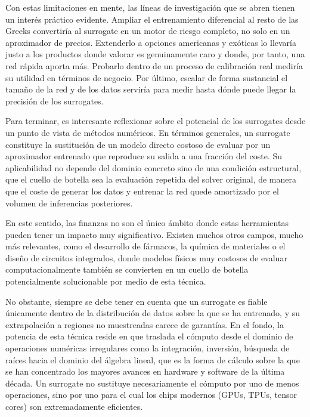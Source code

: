 \documentclass[11pt,a4paper]{article}
\begin{document}
Con estas limitaciones en mente, las líneas de investigación que se abren tienen un interés práctico evidente. Ampliar el entrenamiento diferencial al resto de las Greeks convertiría al surrogate en un motor de riesgo completo, no solo en un aproximador de precios. Extenderlo a opciones americanas y exóticas lo llevaría justo a los productos donde valorar es genuinamente caro y donde, por tanto, una red rápida aporta más. Probarlo dentro de un proceso de calibración real mediría su utilidad en términos de negocio. Por último, escalar de forma sustancial el tamaño de la red y de los datos serviría para medir hasta dónde puede llegar la precisión de los surrogates.

Para terminar, es interesante reflexionar sobre el potencial de los surrogates desde un punto de vista de métodos numéricos. En términos generales, un surrogate constituye la sustitución de un modelo directo costoso de evaluar por un aproximador entrenado que reproduce su salida a una fracción del coste. Su aplicabilidad no depende del dominio concreto sino de una condición estructural, que el cuello de botella sea la evaluación repetida del solver original, de manera que el coste de generar los datos y entrenar la red quede amortizado por el volumen de inferencias posteriores.

En este sentido, las finanzas no son el único ámbito donde estas herramientas pueden tener un impacto muy significativo. Existen muchos otros campos, mucho más relevantes, como el desarrollo de fármacos, la química de materiales o el diseño de circuitos integrados, donde modelos físicos muy costosos de evaluar computacionalmente también se convierten en un cuello de botella potencialmente solucionable por medio de esta técnica.

No obstante, siempre se debe tener en cuenta que un surrogate es fiable únicamente dentro de la distribución de datos sobre la que se ha entrenado, y su extrapolación a regiones no muestreadas carece de garantías. En el fondo, la potencia de esta técnica reside en que traslada el cómputo desde el dominio de operaciones numéricas irregulares como la integración, inversión, búsqueda de raíces hacia el dominio del álgebra lineal, que es la forma de cálculo sobre la que se han concentrado los mayores avances en hardware y software de la última década. Un surrogate no sustituye necesariamente el cómputo por uno de menos operaciones, sino por uno para el cual los chips modernos (GPUs, TPUs, tensor cores) son extremadamente eficientes.
\end{document}
